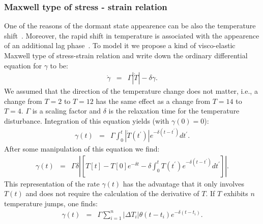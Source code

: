 \documentclass[10pt,A4paper]{article}
\begin{document}
\subsubsection{Maxwell type of stress - strain relation}

One of the reasons of the dormant state appearence can be also the temperature shift~\cite{oliver_viable_1995}.
Moreover, the rapid shift in temperature is associated with the appearence of an additional lag phase~\cite{zwietering_modeling_1994}.
To model it we propose a kind of visco-elastic Maxwell type of stress-strain relation and write down the ordinary differential equation for $\gamma$ to be:
\begin{eqnarray}
\dot{\gamma} &=& \Gamma \left |\dot{T}\right |-\delta \gamma.
\end{eqnarray}
We assumed that the direction of the temperature change does not matter, i.e., a change from $T=2$ to $T=12$ has the same effect as a change from $T=14$ to $T=4$. 
$\Gamma$ is a scaling factor and $\delta$ is the relaxation time for the temperature disturbance. 
Integration of this equation yields (with $\gamma(0)=0$):
\begin{eqnarray}
\gamma(t) &=& \Gamma \int_0^t \left |\dot{T}(t^{\prime})\right |e^{-\delta (t-t^{\prime})}dt^{\prime}.
\end{eqnarray}
After some manipulation of this equation we find:
\begin{eqnarray}
\gamma(t) &=& \Gamma\delta\left |\left[T[t]-T[0]e^{-\delta t}-\delta \int_0^t T(t^{\prime})e^{-\delta (t-t^{\prime})}dt^{\prime}\right]\right |.
\end{eqnarray}
This representation of the rate $\gamma(t)$ has the advantage that it only involves $T(t)$ and does not require the calculation of the derivative of $T$. 
If $T$ exhibits $n$ temperature jumps, one finds:
\begin{eqnarray}
\gamma(t) &=& \Gamma\sum_{i=1}^n \left |\Delta T_i \right |\theta(t-t_i)e^{-\delta(t-t_i)}.
\label{eq:gamma_tempshift}
\end{eqnarray}
\end{document}
